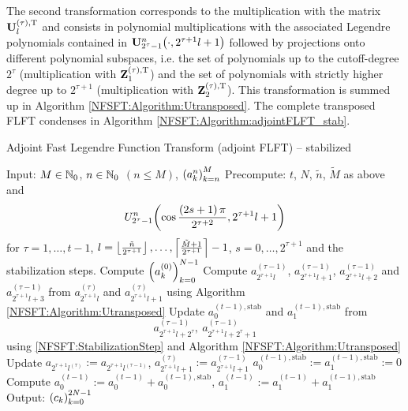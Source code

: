 The second transformation corresponds to the multiplication with the matrix ${\mathbf{U}^{(\tau),\text{\rm{T}}}_l}$ and consists in
polynomial multiplications with the associated Legendre polynomials contained in 
$\mathbf{U}_{2^{\tau}-1}^{n}{\hspace{-0.4ex}}\left(\cdot,2^{\tau+1}l+1\right)$ followed by projections onto different polynomial subspaces, i.e. the set of polynomials up to the cutoff-degree $2^{\tau}$ (multiplication with ${\mathbf{Z}_{1}^{(\tau),\text{\rm{T}}}}$) and the set of 
polynomials with strictly higher degree up to $2^{\tau+1}$ (multiplication with ${\mathbf{Z}_{2}^{(\tau),\text{\rm{T}}}}$). This transformation is summed up 
in Algorithm \ref{NFSFT:Algorithm:Utransposed}.
The complete transposed FLFT condenses in Algorithm \ref{NFSFT:Algorithm:adjointFLFT_stab}.
\begin{algorithm}[tb]
  \caption{Adjoint Fast Legendre Function Transform (adjoint FLFT) -- stabilized}
  \label{NFSFT:Algorithm:adjointFLFT_stab}    
  \begin{algorithmic}
    \STATE Input:  $M \in \mathbb{N}_{0}$, $n \in \mathbb{N}_{0}$ $(n \le M)$, $\left(a_k^n\right)_{k=n}^{M}$
    \STATE Precompute: $t$, $N$, $\tilde{n}$, $\tilde{M}$ as above and \[U_{2^{\tau}-1}^{n}{\hspace{-0.4ex}}\left(\cos \frac{\left(2s+1\right)\pi}{2^{\tau+2}}, 2^{\tau+1}l+1\right)\] 
    \STATE {} for $\tau = 1,\ldots,t-1$, $l = \left\lfloor\frac{\tilde{n}}{2^{\tau+1}}\right\rfloor,\ldots,\left\lceil\frac{\tilde{M}+1}{2^{\tau+1}}\right\rceil-1$, 
    \STATE {} $s = 0,\ldots,2^{\tau+1}$ and the stabilization steps.
    \STATE Compute $\left(a_{k}^{(0)}\right)_{k=0}^{N-1}$ 
          \STATE Compute $a_{2^{\tau+1}l}^{(\tau-1)}$, $a_{2^{\tau+1}l+1}^{(\tau-1)}$, $a_{2^{\tau+1}l+2}^{(\tau-1)}$ and 
          $a_{2^{\tau+1}l+3}^{(\tau-1)}$ from $a_{2^{\tau+1}l}^{(\tau)}$ and $a_{2^{\tau+1}l+1}^{(\tau)}$ using 
          Algorithm \ref{NFSFT:Algorithm:Utransposed}
        \ELSE
          \STATE Update $a_{0}^{(t-1),\text{stab}}$ and $a_{1}^{(t-1),\text{stab}}$ from
            \[ 
              a_{2^{\tau+1}l+2^{\tau}}^{(\tau-1)},\ a_{2^{\tau+1}l+2^{\tau}+1}^{(\tau-1)}
            \] 
            using \eqref{NFSFT:StabilizationStep} and Algorithm \ref{NFSFT:Algorithm:Utransposed}
          \STATE Update $a_{2^{\tau+1}l^{(\tau)}} := a_{2^{\tau+1}l^{(\tau-1)}}$, $a_{2^{\tau+1}l+1}^{(\tau)} := a_{2^{\tau+1}l+1}^{(\tau-1)}$
        \ENDIF
      \ENDFOR
    \ENDFOR
    \STATE $a_{0}^{(t-1),\text{stab}} := a_{1}^{(t-1),\text{stab}} := 0$
    \STATE Compute $a_{0}^{(t-1)} := a_{0}^{(t-1)} + a_{0}^{(t-1),\text{stab}}$, $a_{1}^{(t-1)} := a_{1}^{(t-1)} + a_{1}^{(t-1),\text{stab}}$
    \STATE Output: $\left(c_{k}\right)_{k=0}^{2N-1}$
\end{algorithmic}
\end{algorithm}

